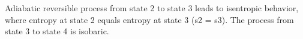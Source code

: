 Adiabatic reversible process from state 2 to state 3 leads to isentropic behavior, where entropy at state 2 equals entropy at state 3 (s2 = s3). The process from state 3 to state 4 is isobaric.